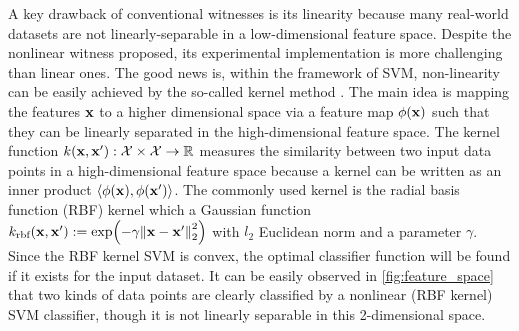 \documentclass[
aps,
pra,
twocolumn,
floatfix,
]{revtex4-2}
\theoremstyle{plain}
\theoremstyle{definition}
\newcommand{\kernel}{k}
\begin{document}
A key drawback of conventional witnesses is its linearity because many real-world datasets are not linearly-separable in a low-dimensional feature space.
Despite the nonlinear witness \cite{guhneNonlinearEntanglementWitnesses2006} proposed, its experimental implementation is more challenging than linear ones.
The good news is,
within the framework of SVM, non-linearity can be easily achieved by the so-called kernel method \cite{hofmannKernelMethodsMachine2008}.
The main idea is mapping the features $\vb{x}$ to a higher dimensional space via a feature map $\phi(\vb{x})$ such that they can be linearly separated in the high-dimensional feature space.
The kernel function $\kernel(\vbx,\vbx'):\mathcal{X}\times \mathcal{X} \to \realnumber$ measures the similarity between two input data points in a high-dimensional feature space because a kernel can be written as an inner product $\langle \phi(\vb{x}),\phi(\vb{x}') \rangle$.
The commonly used kernel is the radial basis function (RBF) kernel which a Gaussian function
$\kernel_{\text{rbf}}(\vbx,\vbx') := \exp(-\gamma\norm{\vbx-\vbx'}^2_2)$ with $l_2$ Euclidean norm and a parameter $\gamma$.
Since the RBF kernel SVM is convex, the optimal classifier function will be found if it exists for the input dataset.
It can be easily observed in \cref{fig:feature_space} that two kinds of data points are clearly classified by a nonlinear (RBF kernel) SVM classifier, though it is not linearly separable in this 2-dimensional space.


\end{document}
